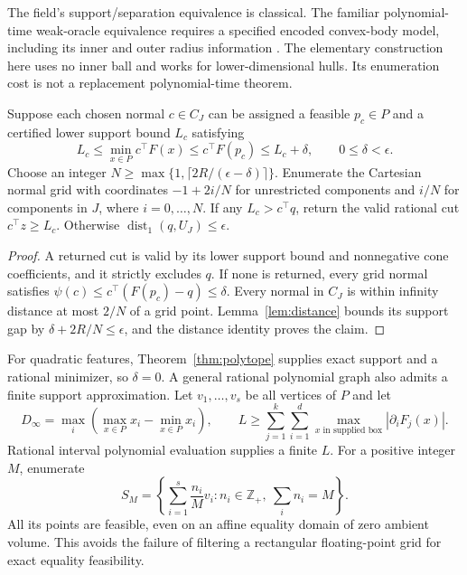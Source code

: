 The field's support/separation equivalence is classical. The familiar
polynomial-time weak-oracle equivalence requires a specified encoded
convex-body model, including its inner and outer radius information
\cite{GrotschelLovaszSchrijver1981}. The elementary construction here
uses no inner ball and works for lower-dimensional hulls. Its enumeration
cost is not a replacement polynomial-time theorem.

\begin{theorem}\label{thm:finite-separation}
Suppose each chosen normal $c\in C_J$ can be assigned a feasible
$p_c\in P$ and a certified lower support bound $L_c$ satisfying
\[
L_c\le\min_{x\in P}c^\top F(x)\le c^\top F(p_c)
\le L_c+\delta,
\qquad 0\le\delta<\epsilon.
\]
Choose an integer
$N\ge\max\{1,\lceil2R/(\epsilon-\delta)\rceil\}$.
Enumerate the Cartesian normal grid with coordinates
$-1+2i/N$ for unrestricted components and $i/N$ for components in $J$,
where $i=0,\ldots,N$. If any $L_c>c^\top q$, return the valid rational
cut $c^\top z\ge L_c$. Otherwise
$\operatorname{dist}_1(q,U_J)\le\epsilon$.
\end{theorem}
\begin{proof}
A returned cut is valid by its lower support bound and nonnegative cone
coefficients, and it strictly excludes $q$. If none is returned, every
grid normal satisfies
$\psi(c)\le c^\top(F(p_c)-q)\le\delta$.
Every normal in $C_J$ is within infinity distance at most $2/N$ of
a grid point. Lemma~\ref{lem:distance} bounds its support gap by
$\delta+2R/N\le\epsilon$, and the distance identity proves the claim.
\end{proof}

For quadratic features, Theorem~\ref{thm:polytope} supplies exact support
and a rational minimizer, so $\delta=0$. A general rational polynomial
graph also admits a finite support approximation. Let
$v_1,\ldots,v_s$ be all vertices of $P$ and let
\[
D_\infty=\max_i\left(\max_{x\in P}x_i-\min_{x\in P}x_i\right),
\qquad
L\ge\sum_{j=1}^k\sum_{i=1}^d
\max_{x\text{ in supplied box}}|\partial_iF_j(x)|.
\]
Rational interval polynomial evaluation supplies a finite $L$.
For a positive integer $M$, enumerate
\[
S_M=\left\{\sum_{i=1}^s\frac{n_i}{M}v_i:
n_i\in\mathbb Z_+,\ \sum_i n_i=M\right\}.
\]
All its points are feasible, even on an affine equality domain of zero
ambient volume. This avoids the failure of filtering a rectangular
floating-point grid for exact equality feasibility.

